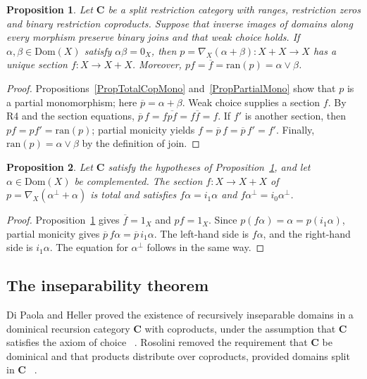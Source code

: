 \documentclass[letterpaper,10pt]{amsart}
\theoremstyle{plain}
\newtheorem{prop}{Proposition}[thm]
\theoremstyle{definition}
\newcommand{\rst}[1]{\overline{#1}}
\begin{document}
\begin{prop}\label{PropCopOut}
Let $\mathbf C$ be a split restriction category with ranges,
restriction zeros and binary restriction coproducts. Suppose that inverse
images of domains along every morphism preserve binary joins and that
weak choice holds.
If $\alpha,\beta\in\mathrm{Dom}(X)$ satisfy $\alpha\beta=0_X$,
then $p=\nabla_X(\alpha+\beta):X+X\to X$ has a unique section
$f:X\to X+X$. Moreover, $pf=\rst f=\mathrm{ran}(p)=\alpha\vee\beta$.
\end{prop}
\begin{proof}
Propositions~\ref{PropTotalCopMono} and~\ref{PropPartialMono} show
that $p$ is a partial monomorphism; here $\rst p=\alpha+\beta$.
Weak choice supplies a section $f$. By R4 and the section equations,
$\rst p\,f=f\rst{pf}=f\rst f=f$.
If $f'$ is another section, then $pf=pf'=\mathrm{ran}(p)$;
partial monicity yields $f=\rst p\,f=\rst p\,f'=f'$.
Finally, $\mathrm{ran}(p)=\alpha\vee\beta$ by the definition of join.
\end{proof}

\begin{prop}\label{PropDichotomy}
Let $\mathbf C$ satisfy the hypotheses of Proposition~\ref{PropCopOut},
and let $\alpha\in\mathrm{Dom}(X)$ be complemented. The section
$f:X\to X+X$ of $p=\nabla_X(\alpha^\perp+\alpha)$ is total and satisfies $f\alpha=i_1\alpha$ and
$f\alpha^\perp=i_0\alpha^\perp$.
\end{prop}
\begin{proof}
Proposition~\ref{PropCopOut} gives $\rst f=1_X$ and $pf=1_X$.
Since $p(f\alpha)=\alpha=p(i_1\alpha)$, partial monicity gives
$\rst p\,f\alpha=\rst p\,i_1\alpha$.
The left-hand side is $f\alpha$, and the right-hand side is
$i_1\alpha$. The equation for $\alpha^\perp$ follows in the same way.
\end{proof}

\subsection{The inseparability theorem}
Di Paola and Heller proved the existence of
recursively inseparable domains in a dominical recursion category
$\mathbf{C}$ with coproducts, under the assumption that $\mathbf{C}$ satisfies the
axiom of choice ~\cite[Theorem 8.15]{MR88i:03078}. Rosolini removed the requirement that $\mathbf{C}$ be dominical and that products distribute over coproducts, 
provided domains split in $\mathbf{C}$ ~\cite{MR90e:18001}.
\end{document}
